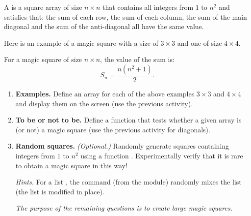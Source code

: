 \documentclass[11pt,class=report,crop=false]{standalone}
\begin{document}

\begin{activite}




A  is a square array of size $n\times n$ that contains all integers from $1$ to $n^2$ and satisfies that:
the sum of each row, the sum of each column, the sum of the main diagonal and the sum of the anti-diagonal all have the same value.

Here is an example of a magic square with a size of $3\times 3$ and one of size  $4\times 4$.





For a magic square of size $n \times n$, the value of the sum is:
$$S_n = \frac{n(n^2+1)}{2}.$$



\begin{enumerate}
  \item \textbf{Examples.} Define an array for each of the above examples $3 \times 3$ and $4 \times 4$ and display them on the screen (use the previous activity).
  
  \item \textbf{To be or not to be.} Define a  function that tests whether a given array is (or not) a magic square (use the previous activity for diagonals).
  
  \item \textbf{Random squares.} \emph{(Optional.)} Randomly generate squares containing integers from $1$ to $n^2$ using a function . Experimentally verify that it is rare to obtain a magic square in this way! 

  \emph{Hints.} For a list , the command  (from the  module) randomly mixes the list (the list is modified in place). 
 
 
 \medskip
	
  \emph{The purpose of the remaining questions is to create large magic squares.}
	 

\end{enumerate}
\end{activite}
\end{document}
